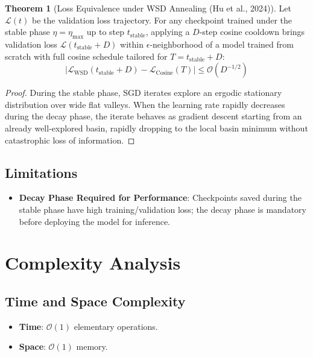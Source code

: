 \documentclass[11pt,a4paper]{article}
\theoremstyle{definition}
\newtheorem{theorem}{Theorem}[section]
\begin{document}
\begin{theorem}[Loss Equivalence under WSD Annealing (Hu et al., 2024)]
Let $\mathcal{L}(t)$ be the validation loss trajectory. For any checkpoint trained under the stable phase $\eta = \eta_{\max}$ up to step $t_{\text{stable}}$, applying a $D$-step cosine cooldown brings validation loss $\mathcal{L}(t_{\text{stable}} + D)$ within $\epsilon$-neighborhood of a model trained from scratch with full cosine schedule tailored for $T = t_{\text{stable}} + D$:
\begin{equation}
|\mathcal{L}_{\text{WSD}}(t_{\text{stable}} + D) - \mathcal{L}_{\text{Cosine}}(T)| \le \mathcal{O}(D^{-1/2})
\end{equation}
\end{theorem}

\begin{proof}
During the stable phase, SGD iterates explore an ergodic stationary distribution over wide flat valleys. When the learning rate rapidly decreases during the decay phase, the iterate behaves as gradient descent starting from an already well-explored basin, rapidly dropping to the local basin minimum without catastrophic loss of information.
\end{proof}

\subsection{Limitations}
\begin{itemize}
    \item \textbf{Decay Phase Required for Performance}: Checkpoints saved during the stable phase have high training/validation loss; the decay phase is mandatory before deploying the model for inference.
\end{itemize}

\section{Complexity Analysis}

\subsection{Time and Space Complexity}
\begin{itemize}
    \item \textbf{Time}: $\mathcal{O}(1)$ elementary operations.
    \item \textbf{Space}: $\mathcal{O}(1)$ memory.
\end{itemize}
\end{document}

